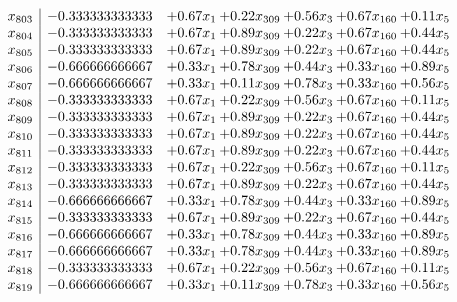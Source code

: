 \documentclass[8pt]{article}
\begin{document}
\[\begin{array}{c| c c@{\hskip 2pt} c@{\hskip 2pt} c@{\hskip 2pt} c@{\hskip 2pt} c@{\hskip 2pt} }
 x_{803}   &  -0.333333333333 & +  0.67 x_{1} & +  0.22 x_{309} & +  0.56 x_{3} & +  0.67 x_{160} & +  0.11 x_{5}\\
 x_{804}   &  -0.333333333333 & +  0.67 x_{1} & +  0.89 x_{309} & +  0.22 x_{3} & +  0.67 x_{160} & +  0.44 x_{5}\\
 x_{805}   &  -0.333333333333 & +  0.67 x_{1} & +  0.89 x_{309} & +  0.22 x_{3} & +  0.67 x_{160} & +  0.44 x_{5}\\
 x_{806}   &  -0.666666666667 & +  0.33 x_{1} & +  0.78 x_{309} & +  0.44 x_{3} & +  0.33 x_{160} & +  0.89 x_{5}\\
 x_{807}   &  -0.666666666667 & +  0.33 x_{1} & +  0.11 x_{309} & +  0.78 x_{3} & +  0.33 x_{160} & +  0.56 x_{5}\\
 x_{808}   &  -0.333333333333 & +  0.67 x_{1} & +  0.22 x_{309} & +  0.56 x_{3} & +  0.67 x_{160} & +  0.11 x_{5}\\
 x_{809}   &  -0.333333333333 & +  0.67 x_{1} & +  0.89 x_{309} & +  0.22 x_{3} & +  0.67 x_{160} & +  0.44 x_{5}\\
 x_{810}   &  -0.333333333333 & +  0.67 x_{1} & +  0.89 x_{309} & +  0.22 x_{3} & +  0.67 x_{160} & +  0.44 x_{5}\\
 x_{811}   &  -0.333333333333 & +  0.67 x_{1} & +  0.89 x_{309} & +  0.22 x_{3} & +  0.67 x_{160} & +  0.44 x_{5}\\
 x_{812}   &  -0.333333333333 & +  0.67 x_{1} & +  0.22 x_{309} & +  0.56 x_{3} & +  0.67 x_{160} & +  0.11 x_{5}\\
 x_{813}   &  -0.333333333333 & +  0.67 x_{1} & +  0.89 x_{309} & +  0.22 x_{3} & +  0.67 x_{160} & +  0.44 x_{5}\\
 x_{814}   &  -0.666666666667 & +  0.33 x_{1} & +  0.78 x_{309} & +  0.44 x_{3} & +  0.33 x_{160} & +  0.89 x_{5}\\
 x_{815}   &  -0.333333333333 & +  0.67 x_{1} & +  0.89 x_{309} & +  0.22 x_{3} & +  0.67 x_{160} & +  0.44 x_{5}\\
 x_{816}   &  -0.666666666667 & +  0.33 x_{1} & +  0.78 x_{309} & +  0.44 x_{3} & +  0.33 x_{160} & +  0.89 x_{5}\\
 x_{817}   &  -0.666666666667 & +  0.33 x_{1} & +  0.78 x_{309} & +  0.44 x_{3} & +  0.33 x_{160} & +  0.89 x_{5}\\
 x_{818}   &  -0.333333333333 & +  0.67 x_{1} & +  0.22 x_{309} & +  0.56 x_{3} & +  0.67 x_{160} & +  0.11 x_{5}\\
 x_{819}   &  -0.666666666667 & +  0.33 x_{1} & +  0.11 x_{309} & +  0.78 x_{3} & +  0.33 x_{160} & +  0.56 x_{5}\\

\end{array}\]
\end{document}
